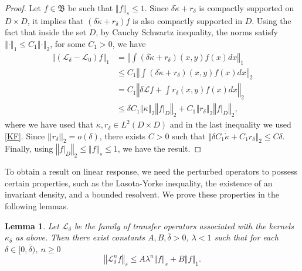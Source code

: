\documentclass{amsart}
\newtheorem{lemma}[theorem]{Lemma}
\newcommand\cL{{\mathcal L}}
\newcommand\fB{{\mathfrak B}}
\newcommand{\norm}[1]{\left\Vert#1\right\Vert}
\begin{document}
\begin{proof}
    Let \(f\in \fB\) be such that $ \norm{f}_s \leq 1$. Since \(\delta\dot \kappa+r_\delta\) is compactly supported on \(D\times D\), it implies that \((\delta\dot \kappa+r_\delta)f\) is also compactly supported in $D$. Using the fact that inside the set \(D\), by Cauchy Schwartz inequality, the norms satisfy \(\norm{\cdot}_{1}\leq C_1 \norm{\cdot}_{2}\), for some $C_1>0$, we have  
\[
\begin{split}
     \norm{(\cL_\delta-\cL_0)f}_{1}&= \norm{\int(\delta \dot{\kappa}+r_\delta)(x,y)f(x)dx}_{1}\\
    &\leq C_1 \norm{\int (\delta \dot{\kappa}+r_\delta)(x,y)f(x)dx}_{2}\\
    & =C_1\norm{\delta\dot \cL f + \int r_\delta(x,y)f(x)dx}_{2}\\
    & \leq \delta C_1\norm{\dot \kappa}_{2}\norm{f|_D}_{2}+C_1\norm{r_\delta}_{2}\norm{f|_D}_{2},
\end{split}
\]
where we have used that \(\dot{\kappa}, r_\delta\in L^2(D\times D)\) 
and in the last inequality we used \eqref{KF}. Since \(||r_\delta||_2=o(\delta)\), there exists \(C>0\) such that \(\norm{\delta C_1 \dot \kappa+ C_1 r_\delta }_{2}\leq C\delta\). Finally, using \(\norm{f|_D}_{2}\leq \norm{f}_s\leq 1\), we have the result.
\end{proof}

To obtain a result on linear response, we need the perturbed operators to possess certain properties, such as the Lasota-Yorke inequality, the existence of an invariant density, and a bounded resolvent. We prove these properties in the following lemmas.
 
\begin{lemma}\label{lem:LY_delta}
Let $\cL_{\delta }$ be the family of transfer operators associated with the kernels $\kappa_{\delta }$ as above. Then there exist constants $A,B,\overline{\delta }>0$, $\lambda<1$ such that for each $\delta \in \lbrack 0,\overline{\delta })$, $n\geq 0$ 
\begin{equation}
\norm{\cL_{\delta }^{n}f}_{s}\leq A\lambda ^{n}\norm{f}_{s}+B\norm{f}_{1} .
\end{equation}
\end{lemma}
\end{document}
